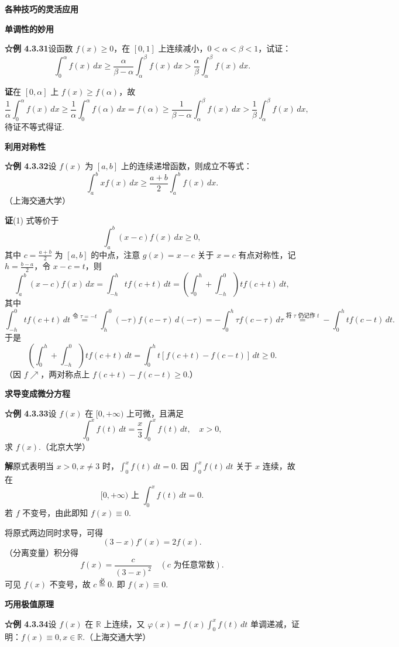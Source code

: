 \documentclass[UTF8, 12pt, fontset=fandol, oneside]{ctexart}
\begin{document}
\noindent\textbf{各种技巧的灵活应用}

\noindent\textbf{单调性的妙用}

\noindent\textbf{☆例 4.3.31}\quad 设函数 $f(x)\ge0$，在 $[0,1]$ 上连续减小，$0<\alpha<\beta<1$，试证：
\[
\int_0^\alpha f(x)\,dx
\ge\frac{\alpha}{\beta-\alpha}\int_\alpha^\beta f(x)\,dx
>\frac{\alpha}{\beta}\int_\alpha^\beta f(x)\,dx.
\]

\noindent\textbf{证}\quad 在 $[0,\alpha]$ 上 $f(x)\ge f(\alpha)$，故
\[
\frac1\alpha\int_0^\alpha f(x)\,dx
\ge\frac1\alpha\int_0^\alpha f(\alpha)\,dx
=f(\alpha)
\ge\frac1{\beta-\alpha}\int_\alpha^\beta f(x)\,dx
>\frac1\beta\int_\alpha^\beta f(x)\,dx,
\]
待证不等式得证.

\noindent\textbf{利用对称性}

\noindent\textbf{☆例 4.3.32}\quad 设 $f(x)$ 为 $[a,b]$ 上的连续递增函数，则成立不等式：
\[
\int_a^b xf(x)\,dx
\ge\frac{a+b}{2}\int_a^b f(x)\,dx.
\tag{1}
\]
（上海交通大学）

\noindent\textbf{证}\quad (1) 式等价于
\[
\int_a^b(x-c)f(x)\,dx\ge0,
\tag{2}
\]
其中 $c=\frac{a+b}{2}$ 为 $[a,b]$ 的中点，注意 $g(x)=x-c$ 关于 $x=c$ 有点对称性，记 $h=\frac{b-a}{2}$，令 $x-c=t$，则
\[
\int_a^b(x-c)f(x)\,dx
=\int_{-h}^h t f(c+t)\,dt
=\left(\int_0^h+\int_{-h}^0\right) t f(c+t)\,dt,
\tag{3}
\]
其中
\[
\int_{-h}^0 t f(c+t)\,dt
\overset{\text{令 }\tau=-t}{=}
\int_h^0(-\tau)f(c-\tau)\,d(-\tau)
=-\int_0^h\tau f(c-\tau)\,d\tau
\overset{\text{将 }\tau\text{ 仍记作 }t}{=}
-\int_0^h t f(c-t)\,dt.
\]
于是
\[
\left(\int_0^h+\int_{-h}^0\right)t f(c+t)\,dt
=\int_0^h t[f(c+t)-f(c-t)]\,dt\ge0.
\]
（因 $f\nearrow$，两对称点上 $f(c+t)-f(c-t)\ge0$.）

\noindent\textbf{求导变成微分方程}

\noindent\textbf{☆例 4.3.33}\quad 设 $f(x)$ 在 $[0,+\infty)$ 上可微，且满足
\[
\int_0^x f(t)\,dt=\frac{x}{3}\int_0^x f(t)\,dt,\quad x>0,
\]
求 $f(x)$.（北京大学）

\noindent\textbf{解}\quad 原式表明当 $x>0,x\ne3$ 时，$\int_0^x f(t)\,dt=0$. 因 $\int_0^x f(t)\,dt$ 关于 $x$ 连续，故在
\[
[0,+\infty)\text{ 上 }\int_0^x f(t)\,dt=0.
\]
若 $f$ 不变号，由此即知 $f(x)\equiv0$.

将原式两边同时求导，可得
\[
(3-x)f'(x)=2f(x).
\]
（分离变量）积分得
\[
f(x)=\frac{c}{(3-x)^2}\quad(c\text{ 为任意常数}).
\]
可见 $f(x)$ 不变号，故 $c\stackrel{\text{必}}{=}0$. 即 $f(x)\equiv0$.

\noindent\textbf{巧用极值原理}

\noindent\textbf{☆例 4.3.34}\quad 设 $f(x)$ 在 $\mathbb{R}$ 上连续，又 $\varphi(x)=f(x)\int_0^x f(t)\,dt$ 单调递减，证明：$f(x)\equiv0,x\in\mathbb{R}$.（上海交通大学）
\end{document}
